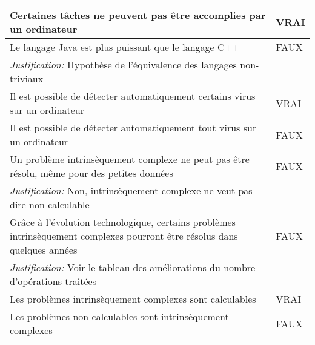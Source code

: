 \begin{tabular}{p{13cm}|l}
  Certaines tâches ne peuvent pas être accomplies par un ordinateur & VRAI \\
  \hline
  Le langage Java est plus puissant que le langage C++ & FAUX \\
  \textit{Justification:} Hypothèse de l'équivalence des langages non-triviaux & \\
  \hline
  Il est possible de détecter automatiquement certains virus sur un ordinateur & VRAI \\
  \hline
  Il est possible de détecter automatiquement tout virus sur un ordinateur & FAUX \\
  \hline
  Un problème intrinsèquement complexe ne peut pas être résolu, même pour des petites données & FAUX \\
  \textit{Justification:} Non, intrinsèquement complexe ne veut pas dire \og{} non-calculable \fg{}& \\
  \hline
  Grâce à l'évolution technologique, certains problèmes intrinsèquement complexes pourront être résolus dans quelques années & FAUX \\
  \textit{Justification:} Voir le tableau des améliorations du nombre d'opérations traitées & \\
  \hline
  Les problèmes intrinsèquement complexes sont calculables & VRAI \\
  \hline
  Les problèmes non calculables sont intrinsèquement complexes & FAUX \\
\end{tabular}
